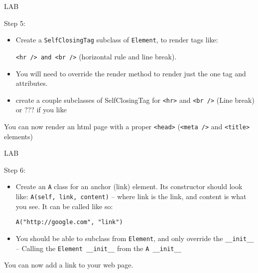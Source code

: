 \documentclass{beamer}
\begin{document}
\begin{frame}[fragile]{LAB}

{\Large Step 5:}

\begin{itemize}
   \item Create a \verb|SelfClosingTag| subclass of \verb|Element|, to render tags like:
   
   \verb|<hr /> and <br />| (horizontal rule and line break).
   
   \item You will need to override the render method to render just the one tag and
   attributes.
   
   \item create a couple subclasses of SelfClosingTag for \verb|<hr>|
   and \verb|<br />| (Line break) or ??? if you like
   \end{itemize}

\vfill
You can now render an html page with a proper \verb|<head>| (\verb|<meta />| and \verb|<title>| elements)
\end{frame}

\begin{frame}[fragile]{LAB}

{\Large Step 6:}

\begin{itemize}
   \item  Create an \verb|A| class for an anchor (link) element. Its constructor should
          look like: \verb|A(self, link, content)| -- where link is the link,
          and content is what you see. It can be called like so:

   \verb|A("http://google.com", "link")|

  \item You should be able to subclass from \verb|Element|, and only override
        the \verb|__init__|\\
        -- Calling the \verb|Element __init__| from the  \verb|A __init__|
\end{itemize}

\vfill
    You can now add a link to your web page.
\end{frame}
\end{document}

